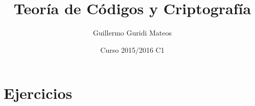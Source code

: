 \documentclass{apuntes}
\title{Teoría de Códigos y Criptografía}
\author{Guillermo Guridi Mateos}
\date{Curso 2015/2016 C1}
\begin{document}
\pagestyle{plain}
\maketitle

\tableofcontents
\newpage

















\appendix

\chapter{Ejercicios}

\printindex
\end{document}
